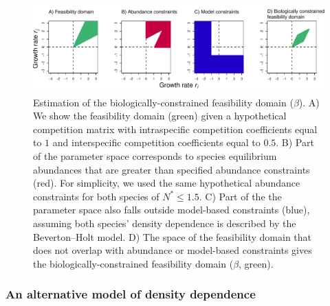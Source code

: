 \begin{refsection}
\begin{landscape}
\begin{figure}[H]
  \centerline{\includegraphics[width=1.7\textwidth]{figures/chapter3_fig1.pdf}}
  \caption[Estimation of the biologically-constrained feasibility domain]{Estimation of the biologically-constrained feasibility domain ($\beta$). A) We show the feasibility domain (green) given a hypothetical competition matrix with intraspecific competition coefficients equal to $1$ and interspecific competition coefficients equal to $0.5$. B) Part of the parameter space corresponds to species equilibrium abundances that are greater than specified abundance constraints (red). For simplicity, we used the same hypothetical abundance constraints for both species of $N^* \le 1.5$. C) Part of the the parameter space also falls outside model-based constraints (blue), assuming both species' density dependence is described by the Beverton--Holt model. D) The space of the feasibility domain that does not overlap with abundance or model-based constraints gives the biologically-constrained feasibility domain ($\beta$, green). }
  \label{fig:domain}
\end{figure}
\end{landscape}


\subsubsection*{An alternative model of density dependence}



\end{refsection}
